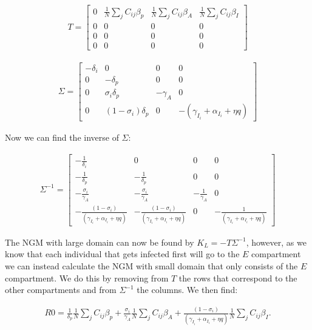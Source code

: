 \documentclass{article}
\begin{document}
\begin{gather}
 T =
  \begin{bmatrix}
   0 & \frac{1}{N} \sum_{j} C_{ij}\beta_p & 
   \frac{1}{N} \sum_{j} C_{ij}\beta_A &
   \frac{1}{N} \sum_{j} C_{ij}\beta_I \\
   0 & 0 & 0 & 0 \\
   0 & 0 & 0 & 0 \\
   0 & 0 & 0 & 0 
   \end{bmatrix}
\end{gather}

\begin{gather}
 \Sigma =
  \begin{bmatrix}
   - \delta_i & 0 & 0 & 0 \\
   0 & -\delta_p & 0 & 0 \\
   0 & \sigma_i \delta_p & -\gamma_A & 0 \\
   0 & (1-\sigma_i) \delta_p & 0 & -(\gamma_{I_i} + \alpha_{I_i} + \eta q) 
   \end{bmatrix}
\end{gather}

Now we can find the inverse of $\Sigma$: 

\begin{gather}
 \Sigma^{-1} =
  \begin{bmatrix}
   - \frac{1}{\delta_i} & 0 & 0 & 0 \\
   -\frac{1}{\delta_p} & -\frac{1}{\delta_p} & 0 & 0 \\
   -\frac{\sigma_i}{\gamma_A} & -\frac{\sigma_i}{\gamma_A} & -\frac{1}{\gamma_A} & 0 \\
   -\frac{(1-\sigma_i)}{(\gamma_{I_i} + \alpha_{I_i} + \eta q)} & -\frac{(1-\sigma_i)}{(\gamma_{I_i} + \alpha_{I_i} + \eta q)} & 0 & -\frac{1}{(\gamma_{I_i} + \alpha_{I_i} + \eta q)} 
   \end{bmatrix}
\end{gather}

The NGM with large domain can now be found by $K_L = - T \Sigma^{-1}$, however, as we know that each individual that gets infected first will go to the $E$ compartment we can instead calculate the NGM with small domain that only consists of the $E$ compartment.
We do this by removing from $T$ the rows that correspond to the other compartments and from $\Sigma^{-1}$ the columns. 
We then find: 

\begin{gather}
R0 = 
   \frac{1}{\delta_p} \frac{1}{N} \sum_{j} C_{ij}\beta_p + \frac{\sigma_i}{\gamma_A}    \frac{1}{N} \sum_{j} C_{ij}\beta_A + \frac{(1-\sigma_i)}{(\gamma_{I_i} + \alpha_{I_i} + \eta q)} \frac{1}{N} \sum_{j} C_{ij}\beta_I.  
\end{gather}
\end{document}
